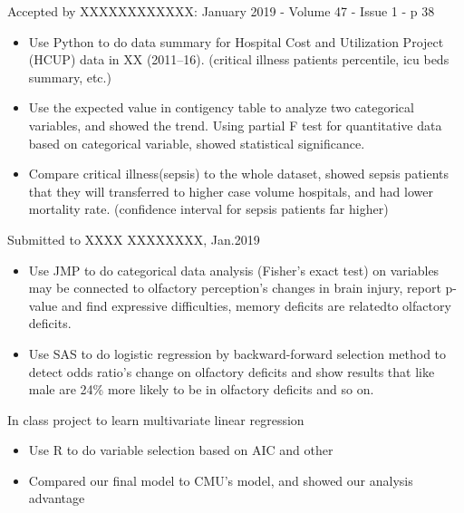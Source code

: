 \documentclass{resume}
\begin{document}
Accepted by XXXXXXXXXXXX: January 2019 - Volume 47 - Issue 1 - p 38
\begin{itemize}
  \item Use Python to do data summary for Hospital Cost and Utilization Project (HCUP) data in XX (2011–16). (critical illness patients percentile, icu beds summary, etc.)
  \item Use the expected value in contigency table to analyze two categorical variables, and showed the trend. Using partial F test for quantitative data based on categorical variable, showed statistical significance.
  \item Compare critical illness(sepsis) to the whole dataset, showed sepsis patients that they will transferred to higher case volume hospitals, and had lower mortality rate. (confidence interval for sepsis patients far higher)
\end{itemize}

Submitted to XXXX XXXXXXXX, Jan.2019
\begin{itemize}
  \item Use JMP to do categorical data analysis (Fisher's exact test) on variables may be connected to olfactory perception's changes in brain injury, report p-value and find expressive difficulties, memory deficits are relatedto olfactory deficits.
  \item Use SAS to do logistic regression by backward-forward selection method to detect odds ratio's change on olfactory deficits and show results that like male are 24\% more likely to be in olfactory deficits and so on.
\end{itemize}

In class project to learn multivariate linear regression
\begin{itemize}
  \item Use R to do variable selection based on AIC and other  
  \item Compared our final model to CMU's model, and showed our analysis advantage
\end{itemize}
\end{document}
